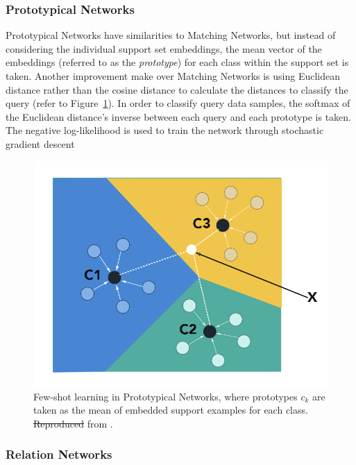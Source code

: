 \documentclass[journal=jcisd8,manuscript=article]{achemso} %
\providecommand{\DIFadd}[1]{{\protect\color{blue}\uwave{#1}}} %
\providecommand{\DIFdel}[1]{{\protect\color{red}\sout{#1}}}                      %
\providecommand{\DIFaddFL}[1]{\DIFadd{#1}} %
\providecommand{\DIFdelFL}[1]{\DIFdel{#1}} %
\providecommand{\DIFaddbeginFL}{} %
\providecommand{\DIFaddendFL}{} %
\providecommand{\DIFdelbeginFL}{} %
\providecommand{\DIFdelendFL}{} %
\begin{document}
\subsubsection{Prototypical Networks}

Prototypical Networks \citep{snell2017prototypical} have similarities to Matching Networks, but instead of considering the individual support set embeddings, the mean vector of the embeddings (referred to as the \textit{prototype}) for each class within the support set is taken. Another improvement \citet{snell2017prototypical} make over Matching Networks is using Euclidean distance rather than the cosine distance to calculate the distances to classify the query (refer to Figure~\ref{fig:protonets}). In order to classify query data samples, the softmax of the Euclidean distance's inverse between each query and each prototype is taken. The negative log-likelihood is used to train the network through stochastic gradient descent

\begin{figure}[!ht]
    \centering
    \DIFdelbeginFL %
\DIFdelendFL \DIFaddbeginFL \includegraphics[width=0.7\linewidth]{img/ProtoNetsAdapt.png}
    \DIFaddendFL \caption{Few-shot learning in Prototypical Networks, where prototypes \textbf{$c_k$} are taken as the mean of embedded support examples for each class. \DIFdelbeginFL \DIFdelFL{Reproduced }\DIFdelendFL \DIFaddbeginFL \DIFaddFL{Adapted }\DIFaddendFL from \citet{snell2017prototypical}.}
    \label{fig:protonets}
\end{figure}

\subsubsection{Relation Networks}
\end{document}
